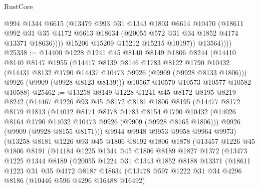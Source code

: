 \begin{lexlean}{RustCore}
\begin{coremodule}
                  @994
                  @1344
                  @6615
                  (@13479
                    @993
                    @31
                    @1343
                    @1803
                    @6614
                    @10470
                    (@18611
                      @992
                      @31
                      @35
                      @4172
                      @6613
                      @18634
                      (@20055 @572 @31 @34 @1852 @4174 @13371 @18636))))
                @15206
                @15209
                @15212
                @15215
                @10197))
            @13564))))
@25338 := @14400
    @1228
    @1241
    @45
    @8140
    @8149
    @1806
    @8244
    (@14410
      @8140
      @8147
      @1955
      (@14417
        @8139
        @8146
        @1783
        @8122
        @1790
        @10432
        (@14431 @8132 @1790 @14437 @10473 @9926 (@9909 (@9928 @8133 @1806)))
        @9926
        (@9909 (@9928 @8123 @8139)))
      @10567
      @10570
      @10573
      @10577
      @10582
      @10588)
@25462 := @13258
    @8149
    @1228
    @1241
    @45
    @8172
    @8195
    @8219
    @8242
    (@14467
      @1226
      @93
      @45
      @8172
      @8181
      @1806
      @8195
      (@14477
        @8172
        @8179
        @1813
        (@14012
          @8171
          @8178
          @1783
          @8154
          @1790
          @10432
          (@14026 @8164 @1790 @14032 @10473 @9926 (@9909 (@9928 @8165 @1806)))
          @9926
          (@9909 (@9928 @8155 @8171)))
        @9944
        @9948
        @9953
        @9958
        @9964
        @9973)
      (@13258
        @8181
        @1226
        @93
        @45
        @1806
        @8192
        @1806
        @1878
        (@13457
          @1226
          @45
          @1806
          @8191
          (@14184
            @1225
            @1344
            @45
            @1806
            @8189
            @1827
            @1372
            (@13473
              @1225
              @1344
              @8189
              (@20055
                @1224
                @31
                @1343
                @1852
                @8188
                @13371
                (@18611
                  @1223
                  @31
                  @35
                  @4172
                  @8187
                  @18634
                  (@13478
                    @597
                    @1222
                    @31
                    @34
                    @4296
                    @8186
                    (@10446 @596 @4296 @16488 @16492)

\end{coremodule}
\end{lexlean}
